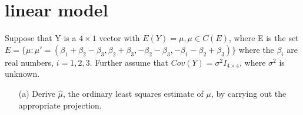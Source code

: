 \section{linear model} 

Suppose that Y is a $4 \times 1$ vector with $E(Y ) = \mu, \mu \in C(E)$, where E is the set $E = \{ \mu: \mu' = (\beta_1 + \beta_2 - \beta_3, \beta_2 + \beta_3, -\beta_2 - \beta_3, -\beta_1-\beta_2 + \beta_3) \} $ where the $\beta_i$ are real numbers, $i = 1, 2, 3$. Further assume that $Cov(Y) = \sigma^2I_{4 \times 4}$, where $\sigma^2$ is unknown.

\begin{itemize}
\item[(a)] Derive $\hat{\mu}$, the ordinary least squares estimate of $\mu$, by carrying out the appropriate projection.
    

\end{itemize}
